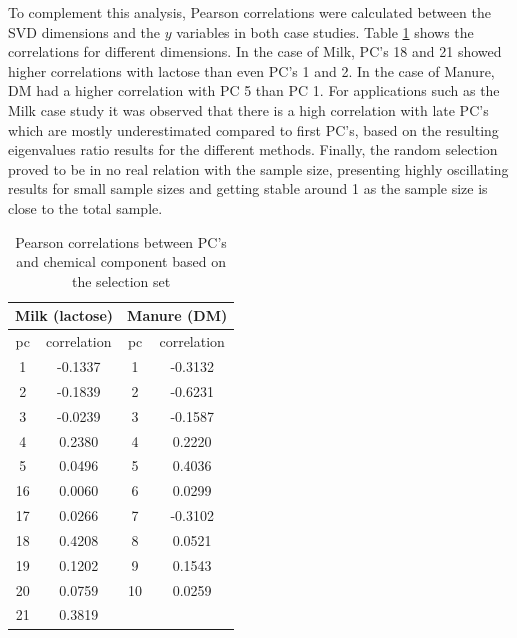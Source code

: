 \documentclass[journal=ancham,manuscript=article]{achemso}
\begin{document}
To complement this analysis, Pearson correlations were calculated between the SVD dimensions and the $y$ variables in both case studies. Table \ref{tab_correlations} shows the correlations for different dimensions. In the case of Milk, PC's 18 and 21 showed higher correlations with lactose than even PC's 1 and 2. In the case of Manure, DM had a higher correlation with PC 5 than PC 1. For applications such as the Milk case study it was observed that there is a high correlation with late PC's which are mostly underestimated compared to first PC's, based on the resulting eigenvalues ratio results for the different methods. Finally, the random selection proved to be in no real relation with the sample size, presenting highly oscillating results for small sample sizes and getting stable around 1 as the sample size is close to the total sample. 


\begin{table}[t]
\centering
\begin{tabular}{|cc|cc|} 
\hline
\multicolumn{2}{|c|}{Milk (lactose)} & \multicolumn{2}{|c|}{Manure (DM)}\\
\hline
pc	& correlation	&  pc & correlation	\\
\hline
  1 & -0.1337 & 1 & -0.3132 \\
  2 & -0.1839 & 2 & -0.6231 \\
  3 & -0.0239 & 3 & -0.1587 \\
  4 &  0.2380 & 4 &  0.2220 \\
  5 &  0.0496 & 5 &  0.4036 \\
 16 &  0.0060 & 6 &  0.0299 \\
 17 &  0.0266 & 7 & -0.3102 \\
 18 &  0.4208 & 8 & 0.0521 \\
 19 &  0.1202 & 9 & 0.1543 \\
 20 &  0.0759 & 10& 0.0259 \\
 21 &  0.3819 &  & \\
 \hline
\end{tabular}
\caption{Pearson correlations between PC's and chemical component based on the selection set}
\label{tab_correlations}
\end{table}
\end{document}
